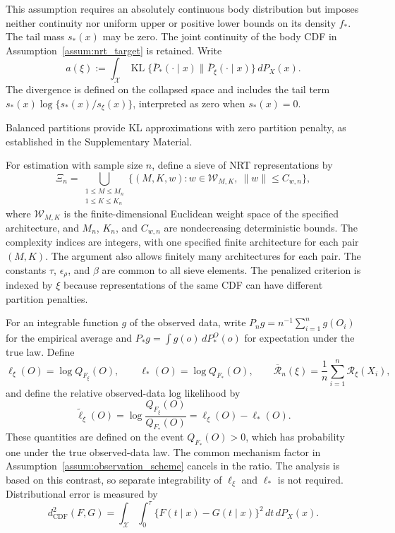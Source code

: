 \documentclass[11pt]{article}
\numberwithin{equation}{section}
\begin{document}
This assumption requires an absolutely continuous body distribution but imposes neither continuity nor uniform upper or positive lower bounds on its density $f_*$. The tail mass $s_*(x)$ may be zero. The joint continuity of the body CDF in Assumption~\ref{assum:nrt_target} is retained. Write
\[
    a(\xi):=\int_{\mathcal X}\operatorname{KL}
       \{\bar P_*(\cdot\mid x)\|\bar P_\xi(\cdot\mid x)\}\,dP_X(x).
\]
The divergence is defined on the collapsed space and includes the tail term $s_*(x)\log\{s_*(x)/s_\xi(x)\}$, interpreted as zero when $s_*(x)=0$.

Balanced partitions provide KL approximations with zero partition penalty, as established in the Supplementary Material.

For estimation with sample size $n$, define a sieve of NRT representations by
\[
    \Xi_n=
    \bigcup_{\substack{1\leq M\leq M_n\\1\leq K\leq K_n}}
       \{(M,K,w):w\in\mathcal W_{M,K},\ \|w\|\leq C_{w,n}\},
\]
where $\mathcal W_{M,K}$ is the finite-dimensional Euclidean weight space of the specified architecture, and $M_n$, $K_n$, and $C_{w,n}$ are nondecreasing deterministic bounds. The complexity indices are integers, with one specified finite architecture for each pair $(M,K)$. The argument also allows finitely many architectures for each pair. The constants $\tau$, $\epsilon_\rho$, and $\beta$ are common to all sieve elements. The penalized criterion is indexed by $\xi$ because representations of the same CDF can have different partition penalties.

For an integrable function $g$ of the observed data, write $P_n g=n^{-1}\sum_{i=1}^n g(O_i)$ for the empirical average and $P_*g=\int g(o)\,dP_*^O(o)$ for expectation under the true law. Define
\[
    \ell_\xi(O)=\log Q_{F_\xi}(O),\qquad
    \ell_*(O)=\log Q_{F_*}(O),\qquad
    \overline{\mathcal R}_n(\xi)
       =\frac1n\sum_{i=1}^n\mathcal R_\xi(X_i),
\]
and define the relative observed-data log likelihood by
\begin{equation}
    \widetilde\ell_\xi(O)=\log\frac{Q_{F_\xi}(O)}{Q_{F_*}(O)}
            =\ell_\xi(O)-\ell_*(O).
    \label{eq:relative-observed-loglikelihood}
\end{equation}
These quantities are defined on the event $Q_{F_*}(O)>0$, which has probability one under the true observed-data law. The common mechanism factor in Assumption~\ref{assum:observation_scheme} cancels in the ratio. The analysis is based on this contrast, so separate integrability of $\ell_\xi$ and $\ell_*$ is not required. Distributional error is measured by
\[
    d_{\mathrm{CDF}}^2(F,G)=
       \int_{\mathcal X}\int_0^\tau
          \{F(t\mid x)-G(t\mid x)\}^2\,dt\,dP_X(x).
\]
\end{document}
